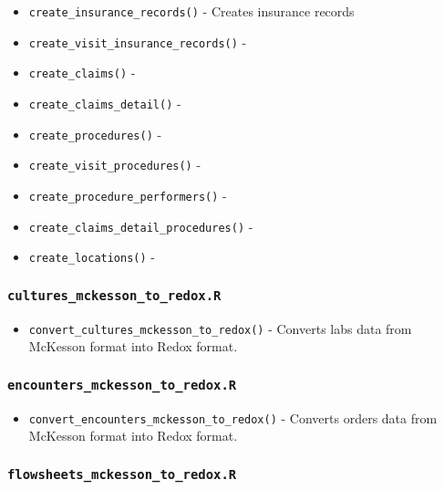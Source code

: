 \documentclass[
]{book}
\providecommand{\tightlist}{%
  \setlength{\itemsep}{0pt}\setlength{\parskip}{0pt}}
\begin{document}
\begin{itemize}
\item
  \texttt{create\_insurance\_records()} - Creates insurance records
\item
  \texttt{create\_visit\_insurance\_records()} -
\item
  \texttt{create\_claims()} -
\item
  \texttt{create\_claims\_detail()} -
\item
  \texttt{create\_procedures()} -
\item
  \texttt{create\_visit\_procedures()} -
\item
  \texttt{create\_procedure\_performers()} -
\item
  \texttt{create\_claims\_detail\_procedures()} -
\item
  \texttt{create\_locations()} -
\end{itemize}

\hypertarget{cultures_mckesson_to_redox.r}{%
\subsubsection{\texorpdfstring{\texttt{cultures\_mckesson\_to\_redox.R}}{cultures\_mckesson\_to\_redox.R}}\label{cultures_mckesson_to_redox.r}}

\begin{itemize}
\tightlist
\item
  \texttt{convert\_cultures\_mckesson\_to\_redox()} - Converts labs data from McKesson format into Redox format.
\end{itemize}

\hypertarget{encounters_mckesson_to_redox.r}{%
\subsubsection{\texorpdfstring{\texttt{encounters\_mckesson\_to\_redox.R}}{encounters\_mckesson\_to\_redox.R}}\label{encounters_mckesson_to_redox.r}}

\begin{itemize}
\tightlist
\item
  \texttt{convert\_encounters\_mckesson\_to\_redox()} - Converts orders data from McKesson format into Redox format.
\end{itemize}

\hypertarget{flowsheets_mckesson_to_redox.r}{%
\subsubsection{\texorpdfstring{\texttt{flowsheets\_mckesson\_to\_redox.R}}{flowsheets\_mckesson\_to\_redox.R}}\label{flowsheets_mckesson_to_redox.r}}
\end{document}
